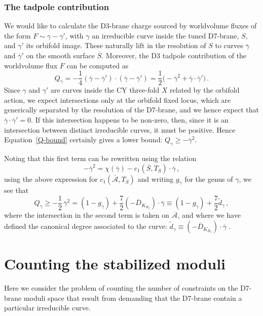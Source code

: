 \documentclass[a4paper,12pt]{article}
\numberwithin{equation}{section}
\newcommand{\mc}{\mathcal}
\newcommand{\be}{\begin{equation}}
\newcommand{\ee}{\end{equation}}
\newcommand{\candl}{\overline{D}_{K_{B_3}}}	%
\newcommand{\cyu}{X}					%
\newcommand{\asl}{\overline{\mc{A}}}	%
\newcommand{\db}{S}					%
\newcommand{\dbl}{\overline{S}}		%
\newcommand{\crv}{\gamma}			%
\newcommand{\crvl}{\overline{\gamma}}	%
\newcommand{\degr}[1]{\tilde{d}_{#1}}			%
\newcommand{\flxcont}[1]{Q_{#1}}		%
\newcommand{\tanb}[1]{T_{#1}}			%
\begin{document}
\subsubsection*{The tadpole contribution}

We would like to calculate the D3-brane charge sourced by worldvolume fluxes of the form $F \sim \crv - \crv'$, with $\crv$ an irreducible curve inside the tuned D7-brane, $\db$, and $\crv'$ its orbifold image. These naturally lift in the resolution of $\db$ to curves $\crvl$ and $\crvl'$ on the smooth surface $\dbl$. Moreover, the D3 tadpole contribution of the worldvolume flux $F$ can be computed as
\be
\flxcont{\crv} = - \frac{1}{4}(\crvl - \crvl') \cdot (\crvl - \crvl') = \frac{1}{2}\big(-\crvl^2 + \crvl \cdot \crvl'\big) \,.
\label{Q-bound}
\ee
Since $\crv$ and $\crv'$ are curves inside the CY three-fold $\cyu$ related by the orbifold action, we expect intersections only at the orbifold fixed locus, which are generically separated by the resolution of the D7-brane, and we hence expect that $\crvl \cdot \crvl' = 0$. If this intersection happens to be non-zero, then, since it is an intersection between distinct irreducible curves, it must be positive. Hence Equation~\eqref{Q-bound} certainly gives a lower bound: $\flxcont{\crv} \geq -\crvl^2$.

Noting that this first term can be rewritten using the relation
\be
-\crvl^2 = \chi(\crvl)- c_1(\dbl,\tanb{\dbl}) \cdot \crvl \,,
\ee
using the above expression for $c_1(\asl,\tanb{\dbl})$ and writing $g_\crv$ for the genus of $\crv$, we see that 
\be
\flxcont{\crv} \geq -\frac{1}{2}\,\crvl^2 = (1-g_\crv) + \frac{7}{2} (-\candl) \cdot \crvl  \equiv (1-g_\crv) + \frac{7}{2} \degr{\crv} \,,
\label{eq:general_q}
\ee
where the intersection in the second term is taken on $\asl$, and where we have defined the canonical degree associated to the curve: $\degr{\crv} \equiv (-\candl) \cdot \crvl$ .

\section{Counting the stabilized moduli}
\label{app:mod_count}

Here we consider the problem of counting the number of constraints on the D7-brane moduli space that result from demanding that the D7-brane contain a particular irreducible curve.

\bigskip
\end{document}
